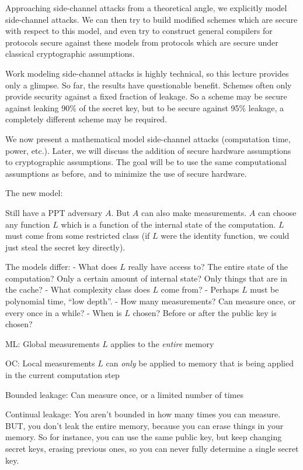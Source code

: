 \documentclass[10pt]{article}
\begin{document}
Approaching side-channel attacks from a theoretical angle, we explicitly model side-channel attacks. We can then try to build modified schemes which are secure with respect to this model, and even try to construct general compilers for protocols secure against these models from protocols which are secure under classical cryptographic assumptions.

Work modeling side-channel attacks is highly technical, so this lecture provides only a glimpse. So far, the results have questionable benefit. Schemes often only provide security against a fixed fraction of leakage. So a scheme may be secure against leaking 90\% of the secret key, but to be secure against 95\% leakage, a completely different scheme may be required.

We now present a mathematical model side-channel attacks (computation time, power, etc.). Later, we will discuss the addition of secure hardware assumptions to cryptographic assumptions. The goal will be to use the same computational assumptions as before, and to minimize the use of secure hardware.

The new model:

Still have a PPT adversary $A$. But $A$ can also make measurements. $A$ can choose any function $L$ which is a function of the internal state of the computation. $L$ must come from some restricted class (if $L$ were the identity function, we could just steal the secret key directly).

The models differ:
- What does $L$ really have access to? The entire state of the computation? Only a certain amount of internal state? Only things that are in the cache?
- What complexity class does $L$ come from?
- Perhaps $L$ must be polynomial time, ``low depth''.
- How many measurements? Can measure once, or every once in a while?
- When is $L$ chosen? Before or after the public key is chosen?

ML: Global measurements
$L$ applies to the \emph{entire} memory

OC: Local measurements
$L$ can \emph{only} be applied to memory that is being applied in the current computation step

Bounded leakage: Can measure once, or a limited number of times

Continual leakage: You aren't bounded in how many times you can measure. BUT, you don't leak the entire memory, because you can erase things in your memory. So for instance, you can use the same public key, but keep changing secret keys, erasing previous ones, so you can never fully determine a single secret key.
\end{document}
